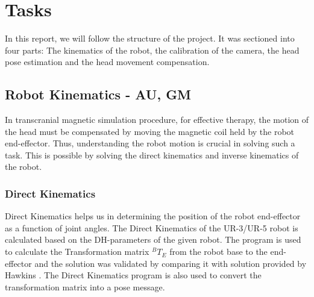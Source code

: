 \documentclass[conference]{IEEEtran}
\begin{document}


\section{Tasks}
In this report, we will follow the structure of the project. It was sectioned into four parts: The kinematics of the robot, the calibration of the camera, the head pose estimation and the head movement compensation.
\subsection{Robot Kinematics - AU, GM}
In transcranial magnetic simulation procedure, for effective therapy, the motion of the head must be compensated by moving the magnetic coil held by the robot end-effector. Thus, understanding the robot motion is crucial in solving such a task. This is possible by solving the direct kinematics and inverse kinematics of the robot. \\

\subsubsection{Direct Kinematics}
Direct Kinematics helps us in determining the position of the robot end-effector as a function of joint angles. The Direct Kinematics of the UR-3/UR-5 robot is calculated based on the DH-parameters of the given robot. The program is used to calculate the Transformation matrix $^B T_E$ from the robot base to the end-effector and the solution was validated by comparing it with solution provided by Hawkins \cite{hawkins2013analytic}. The Direct Kinematics program is also used to convert the transformation matrix into a pose message. \\
\end{document}

